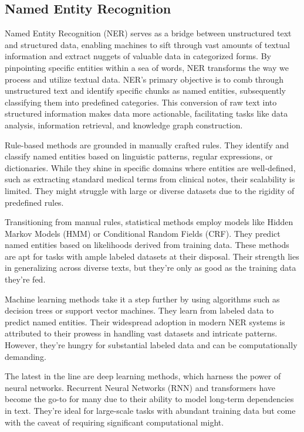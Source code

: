 \subsection{Named Entity Recognition}

Named Entity Recognition (NER)\cite{DataCamp2025NER} serves as a bridge between unstructured text and structured data, enabling machines to sift through vast amounts of textual information and extract nuggets of valuable data in categorized forms. By pinpointing specific entities within a sea of words, NER transforms the way we process and utilize textual data. NER's primary objective is to comb through unstructured text and identify specific chunks as named entities, subsequently classifying them into predefined categories. This conversion of raw text into structured information makes data more actionable, facilitating tasks like data analysis, information retrieval, and knowledge graph construction.

Rule-based methods are grounded in manually crafted rules. They identify and classify named entities based on linguistic patterns, regular expressions, or dictionaries. While they shine in specific domains where entities are well-defined, such as extracting standard medical terms from clinical notes, their scalability is limited. They might struggle with large or diverse datasets due to the rigidity of predefined rules.

Transitioning from manual rules, statistical methods employ models like Hidden Markov Models (HMM) or Conditional Random Fields (CRF). They predict named entities based on likelihoods derived from training data. These methods are apt for tasks with ample labeled datasets at their disposal. Their strength lies in generalizing across diverse texts, but they're only as good as the training data they're fed.

Machine learning methods take it a step further by using algorithms such as decision trees or support vector machines. They learn from labeled data to predict named entities. Their widespread adoption in modern NER systems is attributed to their prowess in handling vast datasets and intricate patterns. However, they're hungry for substantial labeled data and can be computationally demanding.

The latest in the line are deep learning methods, which harness the power of neural networks. Recurrent Neural Networks (RNN) and transformers have become the go-to for many due to their ability to model long-term dependencies in text. They're ideal for large-scale tasks with abundant training data but come with the caveat of requiring significant computational might.


